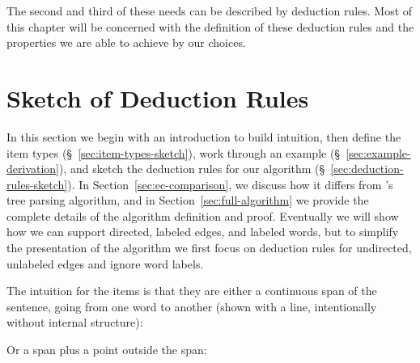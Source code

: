 The second and third of these needs can be described by deduction rules.
Most of this chapter will be concerned with the definition of these deduction rules and the properties we are able to achieve by our choices.

\section{Sketch of Deduction Rules} \label{sec:sketch-of-rules}

\newlength\vertSmall
\newlength\vertBig
\newlength\vertBigger
\newlength{}
\newlength\coordGap

In this section we begin with an introduction to build intuition, then define the item types (\S~\ref{sec:item-types-sketch}), work through an example (\S~\ref{sec:example-derivation}), and sketch the deduction rules for our algorithm (\S~\ref{sec:deduction-rules-sketch}).
In Section~\ref{sec:ec-comparison}, we discuss how it differs from \textcite{ec}'s tree parsing algorithm, and in Section~\ref{sec:full-algorithm} we provide the complete details of the algorithm definition and proof.
Eventually we will show how we can support directed, labeled edges, and labeled words, but to simplify the presentation of the algorithm we first focus on deduction rules for undirected, unlabeled edges and ignore word labels. \\

\noindent
\parbox{4in}{
The intuition for the items is that they are either a continuous span of the sentence, going from one word to another (shown with a line, intentionally without internal structure): \\
}\hfill{}\hfill\strut

\noindent
\parbox{4in}{
Or a span plus a point outside the span: \\
}\hfill{}\hfill\strut

